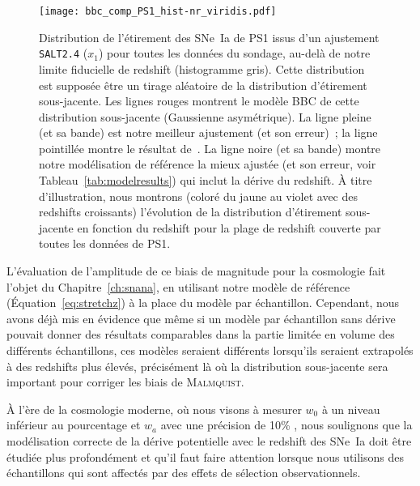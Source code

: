 \documentclass[../main/main.tex]{subfiles}
\begin{document}
\begin{figure}[ht]
    \centering
    \texttt{[image: bbc\_comp\_PS1\_hist-nr\_viridis.pdf]}

    \caption[Comparaison des modélisations de BBC et de notre modèle de
    référence sur l'histogramme des étirements de PS1]{Distribution de
        l'étirement des SNe~Ia de PS1 issus d'un ajustement \texttt{SALT2.4}
        ($x_1$) pour toutes les données du sondage, au-delà de notre limite
        fiducielle de redshift (histogramme gris). Cette distribution est
        supposée être un tirage aléatoire de la distribution d'étirement
        sous-jacente. Les lignes rouges montrent le modèle BBC de cette
        distribution sous-jacente (Gaussienne asymétrique). La ligne pleine (et
        sa bande) est notre meilleur ajustement (et son erreur)~; la ligne
        pointillée montre le résultat de~\cite{scolnic2018}. La ligne noire (et
        sa bande) montre notre modélisation de référence la mieux ajustée (et
        son erreur, voir Tableau~\ref{tab:modelresults}) qui inclut la dérive du
        redshift. À titre d'illustration, nous montrons (coloré du jaune au
        violet avec des redshifts croissants) l'évolution de la distribution
        d'étirement sous-jacente en fonction du redshift pour la plage de
    redshift couverte par toutes les données de PS1.}
    \label{fig:bbc_pdf_ps1}

\end{figure}

L'évaluation de l'amplitude de ce biais de magnitude pour la cosmologie fait
l'objet du Chapitre~\ref{ch:snana}, en utilisant notre modèle de référence
(Équation~\ref{eq:stretchz}) à la place du modèle par échantillon. Cependant,
nous avons déjà mis en évidence que même si un modèle par échantillon sans
dérive pouvait donner des résultats comparables dans la partie limitée en volume
des différents échantillons, ces modèles seraient différents lorsqu'ils
seraient extrapolés à des redshifts plus élevés, précisément là où la
distribution sous-jacente sera important pour corriger les biais de
\textsc{Malmquist}.

À l'ère de la cosmologie moderne, où nous visons à mesurer $w_0$ à un niveau
inférieur au pourcentage et $w_a$ avec une précision de 10\% \citep[par
exemple,][]{ivezic2019}, nous soulignons que la modélisation correcte de la
dérive potentielle avec le redshift des SNe~Ia doit être étudiée plus
profondément et qu'il faut faire attention lorsque nous utilisons des
échantillons qui sont affectés par des effets de sélection observationnels.
\end{document}
